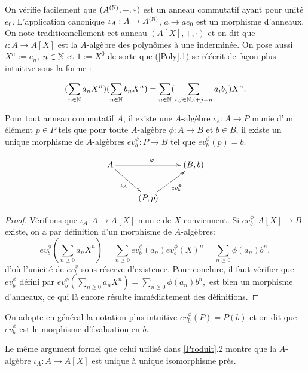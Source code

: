 On vérifie facilement que $(A^{(\mathbb{N})},+,*)$ est un anneau commutatif ayant pour
unité $e_0$. L'application canonique $\iota_A:A\rightarrow A^{(\mathbb{N})}$,
$a\rightarrow ae_0  $  est un morphisme d'anneaux.  On note traditionnellement
cet anneau $(A[X],+,\cdot)$ et on dit que $\iota:A\rightarrow A[X]$ est la
$A$-algèbre des polynômes à une inderminée. On pose aussi $X^n:=e_n$, $n\in \mathbb{N}$
et $1:=X^0$ de sorte que (\ref{Poly}.1) se réécrit de façon plus intuitive sous
la forme :

\begin{equation}
    (\sum_{n\in\mathbb{N}}a_nX^n)(\sum_{n\in \mathbb{N}}b_nX^n)=\sum_{n\in \mathbb{N}}(\sum_{i,j\in \mathbb{N},
    i+j=n}a_ib_j)X^n.
\end{equation} 

\begin{lemme}
    Pour tout anneau commutatif $A$, il existe une $A$-algèbre $\iota_A:
    A\rightarrow P$ munie d'un élément $p\in P$ tels que pour toute $A$-algèbre
    $\phi: A\rightarrow B$ et  $b\in B$, il existe un unique  morphisme de
    $A$-algèbres $ev^\phi_b:P\rightarrow B$  tel que $ ev^\phi_b(p)=b$.
\end{lemme}

	$$ \xymatrix{A \ar[rd]_{\iota_A} \ar[rr]^\varphi && (B, b) \\ & (P, p) \ar[ru]_{ev_b^\Phi}} $$

\begin{proof}
    Vérifions que $\iota_A:A\rightarrow A[X]$ munie de $X$ conviennent. Si
    $ev_b^\phi:A[X]\rightarrow B$ existe,  on a par définition d'un morphisme
    de $A$-algèbres: $$ev^\phi_b(\sum_{n\geq 0}a_nX^n)=\sum_{n\geq
    0}ev_b^\phi(a_n)ev_b^\phi(X)^n=\sum_{n\geq 0}\phi(a_n)b^n,$$ d'où l'unicité
    de $ev_b^\phi$ sous réserve d'existence.  Pour conclure, il faut vérifier
    que $ev_b^\phi$ défini par  $ev^\phi_b(\sum_{n\geq 0}a_nX^n)= \sum_{n\geq
    0}\phi(a_n)b^n,$ est bien un morphisme d'anneaux, ce qui là encore résulte
    immédiatement des définitions.
\end{proof}

On adopte en général la notation plus intuitive $ev_{b}^\phi(P)=P( b)$ et on
dit que $ev_{b}^\phi$ est le morphisme d'évaluation en $b$.

\begin{remarque}
    Le même argument  formel que celui utilisé dans \ref{Produit}.2 montre que
    la $A$-algèbre $\iota_A:A\rightarrow A[X]$ est unique à unique isomorphisme
    près.
\end{remarque}

